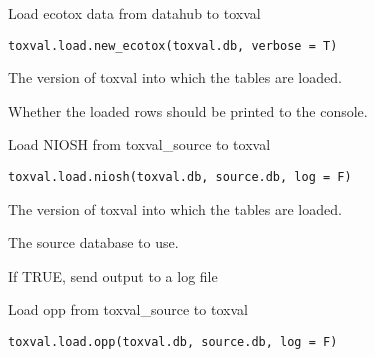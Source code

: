 \documentclass[letterpaper]{book}
\begin{document}
%
\begin{Description}\relax
Load ecotox data from datahub to toxval
\end{Description}
%
\begin{Usage}
\begin{verbatim}
toxval.load.new_ecotox(toxval.db, verbose = T)
\end{verbatim}
\end{Usage}
%
\begin{Arguments}
\begin{ldescription}
\item[\code{toxval.db}] The version of toxval into which the tables are loaded.

\item[\code{verbose}] Whether the loaded rows should be printed to the console.
\end{ldescription}
\end{Arguments}
%
\begin{Description}\relax
Load NIOSH from toxval\_source to toxval
\end{Description}
%
\begin{Usage}
\begin{verbatim}
toxval.load.niosh(toxval.db, source.db, log = F)
\end{verbatim}
\end{Usage}
%
\begin{Arguments}
\begin{ldescription}
\item[\code{toxval.db}] The version of toxval into which the tables are loaded.

\item[\code{source.db}] The source database to use.

\item[\code{log}] If TRUE, send output to a log file
\end{ldescription}
\end{Arguments}
%
\begin{Description}\relax
Load opp from toxval\_source to toxval
\end{Description}
%
\begin{Usage}
\begin{verbatim}
toxval.load.opp(toxval.db, source.db, log = F)
\end{verbatim}
\end{Usage}
\end{document}
